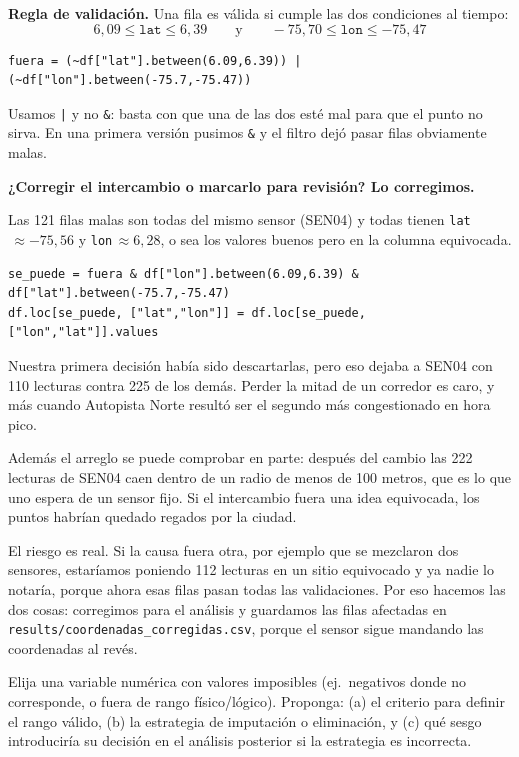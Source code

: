 \documentclass[11pt]{article}
\begin{document}
\begin{respuesta}[Respuesta 2.4]
\noindent\textbf{Regla de validación.} Una fila es válida si cumple las dos condiciones al tiempo:
$$6{,}09 \leq \texttt{lat} \leq 6{,}39 \qquad \text{y} \qquad -75{,}70 \leq \texttt{lon} \leq -75{,}47$$

\begin{verbatim}
fuera = (~df["lat"].between(6.09,6.39)) | (~df["lon"].between(-75.7,-75.47))
\end{verbatim}

Usamos \texttt{|} y no \texttt{\&}: basta con que una de las dos esté mal para que el punto no sirva. En una primera versión pusimos \texttt{\&} y el filtro dejó pasar filas obviamente malas.

\medskip
\noindent\textbf{¿Corregir el intercambio o marcarlo para revisión? Lo corregimos.}

Las 121 filas malas son todas del mismo sensor (SEN04) y todas tienen \texttt{lat}$\,\approx -75{,}56$ y \texttt{lon}$\,\approx 6{,}28$, o sea los valores buenos pero en la columna equivocada.

\begin{verbatim}
se_puede = fuera & df["lon"].between(6.09,6.39) & df["lat"].between(-75.7,-75.47)
df.loc[se_puede, ["lat","lon"]] = df.loc[se_puede, ["lon","lat"]].values
\end{verbatim}

Nuestra primera decisión había sido descartarlas, pero eso dejaba a SEN04 con 110 lecturas contra 225 de los demás. Perder la mitad de un corredor es caro, y más cuando Autopista Norte resultó ser el segundo más congestionado en hora pico.

Además el arreglo se puede comprobar en parte: después del cambio las 222 lecturas de SEN04 caen dentro de un radio de menos de 100 metros, que es lo que uno espera de un sensor fijo. Si el intercambio fuera una idea equivocada, los puntos habrían quedado regados por la ciudad.

\medskip
\noindent El riesgo es real. Si la causa fuera otra, por ejemplo que se mezclaron dos sensores, estaríamos poniendo 112 lecturas en un sitio equivocado y ya nadie lo notaría, porque ahora esas filas pasan todas las validaciones. Por eso hacemos las dos cosas: corregimos para el análisis y guardamos las filas afectadas en \texttt{results/coordenadas\_corregidas.csv}, porque el sensor sigue mandando las coordenadas al revés.
\end{respuesta}


\begin{pregunta}
Elija una variable numérica con valores imposibles (ej.\ negativos donde no corresponde, o fuera de rango físico/lógico). Proponga: (a) el criterio para definir el rango válido, (b) la estrategia de imputación o eliminación, y (c) qué sesgo introduciría su decisión en el análisis posterior si la estrategia es incorrecta.
\end{pregunta}
\end{document}

